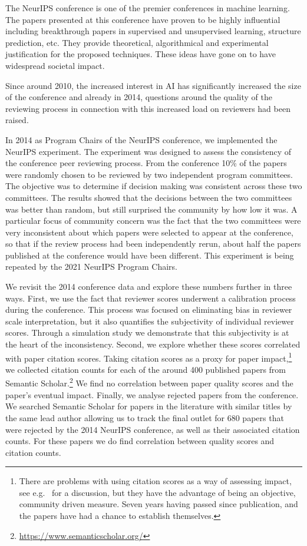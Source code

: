 \documentclass[twoside]{article}
\begin{document}
The NeurIPS conference is one of the premier conferences in machine
learning.  The papers presented at this conference have
proven to be highly influential including breakthrough papers in
supervised and unsupervised learning, structure prediction, etc. They provide theoretical, algorithmical and experimental justification
for the proposed techniques. These ideas have gone on to have widespread
societal impact.

Since around 2010, the increased interest in AI has
significantly increased the size of the conference and already in
2014, questions around the quality of the reviewing process in
connection with this increased load on reviewers had been raised.

In 2014 as Program Chairs of the NeurIPS conference, we implemented the NeurIPS experiment. The experiment
was designed to assess the consistency of the conference peer
reviewing process. From the conference 10\% of the papers were
randomly chosen to be reviewed by two independent program
committees. The objective was to determine if decision making was
consistent across these two committees.  The results showed that the
decisions between the two committees was better than random, but still
surprised the community by how low it was.  A particular focus of community concern was
the fact that the two committees were 
very inconsistent about which papers were selected to appear at the
conference, so that if the review process had been independently
rerun, about half the papers published at the conference would have
been different. This experiment is being repeated by the 2021 NeurIPS Program Chairs.

We revisit the 2014 conference data and explore these numbers further
in three ways. First, we use the fact that reviewer scores underwent a
calibration process during the conference. This process was focused on
eliminating bias in reviewer scale interpretation, but it also
quantifies the subjectivity of individual reviewer scores. Through a
simulation study we demonstrate that this subjectivity is at the
heart of the inconsistency. Second, we explore whether these scores
correlated with paper citation scores.  Taking citation scores as a
proxy for paper impact,\footnote{There are problems with using
  citation scores as a way of assessing impact, see
  e.g.\ \cite{Neylon-article09} for a discussion, but they have the
  advantage of being an objective, community driven measure. Seven
  years having passed since publication, and the papers have had a
  chance to establish themselves.} we collected citation counts for
each of the around 400 published papers from Semantic
Scholar.\footnote{\url{https://www.semanticscholar.org/}} We find no
correlation between paper quality scores and the paper's eventual
impact. Finally, we analyse rejected papers from the conference. We
searched Semantic Scholar for papers in the literature with similar titles by the same
lead author allowing us to track the final outlet
for 680 papers that were rejected by the 2014 NeurIPS conference, as
well as their associated citation counts. For these papers we do find
correlation between quality scores and citation counts.
\end{document}
